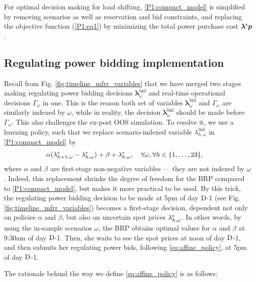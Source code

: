 For optimal decision making for load shifting, \eqref{P1:compact_model} is simplified by removing scenarios as well as reservation and bid constraints, and replacing the objective function (\ref{P1:eq1}) by minimizing the total power purchase cost $\bm{\lambda}^{\rm{s}} \bm{p}$.

\vspace{-1mm}
\subsection{Regulating power bidding implementation}\label{sec:mFRR_bidding_implementation}
Recall from  Fig. \ref{fig:timeline_mfrr_variables} that we have merged two stages making regulating power bidding decisions $\bm{\lambda}_{\omega}^{\text{bid}}$ and real-time operational decisions $\Gamma_{\omega}$ in one. This is the reason both set of variables $\bm{\lambda}_{\omega}^{\text{bid}}$ and $\Gamma_{\omega}$ are similarly indexed by $\omega$, while in reality, the decision $\bm{\lambda}_{\omega}^{\text{bid}}$ should be made before $\Gamma_{\omega}$. This also challenges the ex-post OOS simulation. To resolve it, we use a learning policy, such that we replace scenario-indexed variable $\lambda_{h,\omega}^{\text{bid}}$ in \eqref{P1:compact_model} by 
%
    \begin{align}\label{eq:affine_policy}
        & \alpha ( \lambda_{h+1,\omega}^{\rm{s}} - \lambda_{h,\omega}^{\rm{s}}) + \beta + \lambda_{h,\omega}^{\rm{s}}, \quad \forall{\omega}, \forall{h} \in \{1, \ldots, 23\},
    \end{align}
where $\alpha$ and $\beta$ are first-stage non-negative variables --- they are not indexed by $\omega$. Indeed, this replacement shrinks the degree of freedom for the BRP compared to \eqref{P1:compact_model}, but makes it more practical to be used. By this trick, the regulating power bidding decision to be made at 5pm of day $\rm{D}$-1 (see Fig. \ref{fig:timeline_mfrr_variables}) becomes a first-stage decision, dependent not only on policies $\alpha$ and $\beta$, but also on uncertain spot prices $\lambda_{h,\omega}^{\rm{s}}$. In other words, by using the in-sample scenarios $\omega$, the BRP obtains optimal values for $\alpha$ and $\beta$ at 9:30am of day $\rm{D}$-1. Then, she waits to see the spot prices at noon of day $\rm{D}$-1, and then submits her regulating power bids, following \eqref{eq:affine_policy}, at 5pm of day $\rm{D}$-1.

The rationale behind the way we define \eqref{eq:affine_policy} is as follows:  

